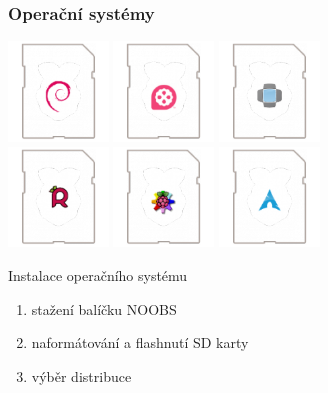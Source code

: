 \documentclass{beamer}
\begin{document}
\begin{frame}\frametitle{Operační systémy}
\centering
\includegraphics[width=0.2\textwidth]{raspbian.png}
\includegraphics[width=0.2\textwidth]{pidora.png}
\includegraphics[width=0.2\textwidth]{openelec.png}\\
\includegraphics[width=0.2\textwidth]{raspbmc.png}
\includegraphics[width=0.2\textwidth]{riscos.png}
\includegraphics[width=0.2\textwidth]{arch.png}

\begin{exampleblock}{Instalace operačního systému}
\begin{enumerate}
\item stažení balíčku NOOBS
\item naformátování a flashnutí SD karty
\item výběr distribuce
\end{enumerate}
\end{exampleblock}
\end{frame}
\end{document}
